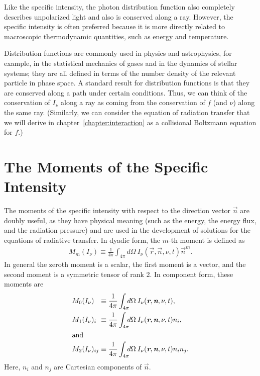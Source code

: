 Like the specific intensity, the photon distribution function also
completely describes unpolarized light and also is conserved along a
ray. However, the specific intensity is often preferred because it is
more directly related to macroscopic thermodynamic quantities, such as
energy and temperature.

Distribution functions are commonly used in physics and astrophysics,
for example, in the statistical mechanics of gases and in the dynamics
of stellar systems; they are all defined in terms of the number density of the relevant particle in phase space. A standard result for distribution functions is that they are
conserved along a path under certain conditions. Thus, we can think of the conservation of
$I_\nu$ along a ray as coming from the conservation of $f$ (and $\nu$)
along the same ray. (Similarly, we can consider the equation of
radiation transfer that we will derive in chapter~\ref{chapter:interaction} as a collisional
Boltzmann equation for $f$.)

\newslide

\section{The Moments of the Specific Intensity}

The moments of the specific intensity with respect to the direction
vector $\vec n$ are doubly useful, as they have physical meaning (such
as the energy, the energy flux, and the radiation pressure) and are used
in the development of solutions for the equations of radiative transfer.
In dyadic form, the $m$-th moment is defined as
\begin{align}
M_m(I_\nu) \equiv \frac{1}{4\pi} \int_{4\pi}\!\!\!d\Omega\:
I_\nu(\vec r, \vec n, \nu, t) \vec n^m.
\end{align}
In general the zeroth moment is a scalar, the first moment is a vector, and the
second moment is a symmetric tensor of rank 2. In component form, these moments are
\begin{align}
M_0(I_\nu)_{\phantom{ij}}
&\equiv 
\frac{1}{4\pi} \int_{4\pi}\!\!\!d\Omega\:
I_\nu(\vec r, \vec n, \nu, t),\\
M_1(I_\nu)_{i\phantom{j}}
&\equiv 
\frac{1}{4\pi} \int_{4\pi}\!\!\!d\Omega\:
I_\nu(\vec r, \vec n, \nu, t) n_i,\\
\intertext{and}
M_2(I_\nu)_{ij}
&\equiv 
\frac{1}{4\pi} 
\int_{4\pi}\!\!\!d\Omega\:
I_\nu(\vec r, \vec n, \nu, t) n_i n_j.
\end{align}
Here, $n_i$ and $n_j$ are Cartesian components of $\vec n$.

